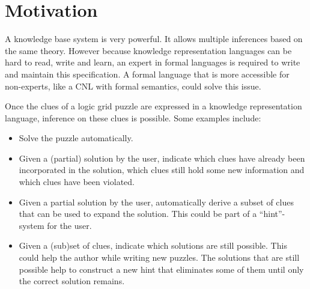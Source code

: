 \section{Motivation}
A knowledge base system is very powerful. It allows multiple inferences based on the same theory. However because knowledge representation languages can be hard to read, write and learn, an expert in formal languages is required to write and maintain this specification. A formal language that is more accessible for non-experts, like a CNL with formal semantics, could solve this issue.

Once the clues of a logic grid puzzle are expressed in a knowledge representation language, inference on these clues is possible. Some examples include:
\begin{itemize}
  \item Solve the puzzle automatically.
  \item Given a (partial) solution by the user, indicate which clues have already been incorporated in the solution, which clues still hold some new information and which clues have been violated.
  \item Given a partial solution by the user, automatically derive a subset of clues that can be used to expand the solution. This could be part of a ``hint''-system for the user.
  \item Given a (sub)set of clues, indicate which solutions are still possible. This could help the author while writing new puzzles. The solutions that are still possible help to construct a new hint that eliminates some of them until only the correct solution remains.
\end{itemize}
